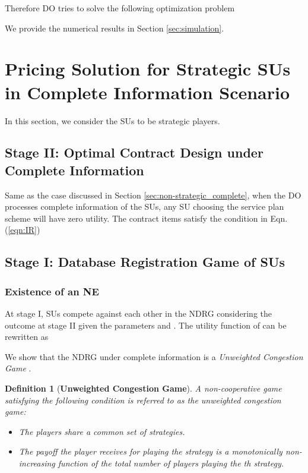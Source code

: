 \documentclass[journal]{IEEEtran}
\newtheorem{definition}{Definition}
\begin{document}
Therefore DO tries to solve the following optimization problem

We provide the numerical results in Section \ref{sec:simulation}.

\section{Pricing Solution for Strategic SUs in Complete Information Scenario}
\label{sec:strategic_complete}

In this section, we consider the SUs to be strategic players.

\subsection{Stage II: Optimal Contract Design under Complete Information}

Same as the case discussed in Section \ref{sec:non-strategic_complete}, when the DO processes complete information of the SUs, any SU choosing the service plan scheme will have zero utility.
The contract items  satisfy the condition in Eqn. (\ref{eqn:IR})

\subsection{Stage I: Database Registration Game of SUs}

\subsubsection{Existence of an NE}

At stage I, SUs compete against each other in the NDRG considering the outcome at stage II given the parameters  and . The utility function of  can be rewritten as


We show that the NDRG under complete information is a \emph{Unweighted Congestion Game} \cite{congestion_game}.
\begin{definition}[\textbf{Unweighted Congestion Game}]
A non-cooperative game satisfying the following condition is referred to as the unweighted congestion game:
\begin{itemize}
  \item The players share a common set of strategies.
  \item The payoff the  player receives for playing the  strategy is a monotonically non-increasing function of the total number  of players playing the th strategy.
\end{itemize}
\end{definition}
\end{document}

